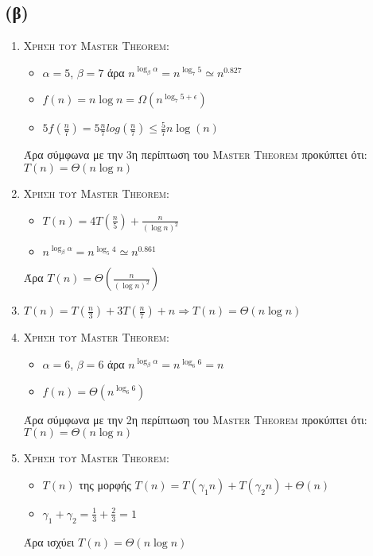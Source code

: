 \documentclass[a4paper,12pt]{report}
\begin{document}
\subsection*{(β)}
\begin{enumerate}
 \item \textsc{Χρήση του Master Theorem}:
\begin{itemize}
 \item $\alpha=5$, $\beta=7$ άρα $n^{\log_{\beta}{\alpha}}=n^{\log_{7}{5}} \simeq n^{0.827}$
 \item $f(n)=n \log n=\Omega (n^{\log_{7}{5}+\epsilon})$ 
 \item $5f(\frac{n}{7})=5\frac{n}{7}log(\frac{n}{7}) \leq \frac{5}{7}n\log(n)$
\end{itemize}
Άρα σύμφωνα με την 3η περίπτωση του \textsc{Master Theorem} προκύπτει ότι: $T(n)=\Theta (n \log n)$ 
 \item \textsc{Χρήση του Master Theorem}:
\begin{itemize}
 \item $T(n)=4T(\frac{n}{5})+\frac{n}{(\log n)^2}$
 \item $n^{\log_{\beta}{\alpha}}=n^{\log_{5}{4}} \simeq n^{0.861}$
\end{itemize}
Άρα $T(n)=\Theta(\frac{n}{(\log n)^2})$
 \item $T(n)=T(\frac{n}{3})+3T(\frac{n}{7})+n \Longrightarrow T(n) = \Theta (n \log n)$
 \item \textsc{Χρήση του Master Theorem}:
\begin{itemize}
 \item $\alpha=6$, $\beta=6$ άρα $n^{\log_{\beta}{\alpha}}=n^{\log_{6}{6}}=n$
 \item $f(n)=\Theta (n^{\log_{6}{6}})$
\end{itemize}
Άρα σύμφωνα με την 2η περίπτωση του \textsc{Master Theorem} προκύπτει ότι: $T(n)=\Theta (n \log n)$
 \item \textsc{Χρήση του Master Theorem}:
\begin{itemize}
 \item $T(n)$ της μορφής $T(n)=T(\gamma_1 n)+T(\gamma_2 n)+\Theta(n)$
 \item $\gamma_1 + \gamma_2 = \frac{1}{3} + \frac{2}{3} =1$
\end{itemize}
Άρα ισχύει $T(n)=\Theta (n\log n)$


\end{enumerate}
\end{document}
